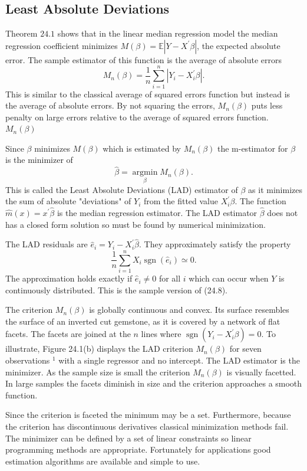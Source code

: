 \documentclass[10pt]{article}
\begin{document}
\subsection{Least Absolute Deviations}
Theorem $24.1$ shows that in the linear median regression model the median regression coefficient minimizes $M(\beta)=\mathbb{E}\left|Y-X^{\prime} \beta\right|$, the expected absolute error. The sample estimator of this function is the average of absolute errors
$$
M_{n}(\beta)=\frac{1}{n} \sum_{i=1}^{n}\left|Y_{i}-X_{i}^{\prime} \beta\right| .
$$
This is similar to the classical average of squared errors function but instead is the average of absolute errors. By not squaring the errors, $M_{n}(\beta)$ puts less penalty on large errors relative to the average of squared errors function. $M_{n}(\beta)$

Since $\beta$ minimizes $M(\beta)$ which is estimated by $M_{n}(\beta)$ the m-estimator for $\beta$ is the minimizer of
$$
\widehat{\beta}=\underset{\beta}{\operatorname{argmin}} M_{n}(\beta) .
$$
This is called the Least Absolute Deviations (LAD) estimator of $\beta$ as it minimizes the sum of absolute "deviations" of $Y_{i}$ from the fitted value $X_{i}^{\prime} \beta$. The function $\widehat{m}(x)=x^{\prime} \widehat{\beta}$ is the median regression estimator. The LAD estimator $\widehat{\beta}$ does not has a closed form solution so must be found by numerical minimization.

The LAD residuals are $\widehat{e}_{i}=Y_{i}-X_{i}^{\prime} \widehat{\beta}$. They approximately satisfy the property
$$
\frac{1}{n} \sum_{i=1}^{n} X_{i} \operatorname{sgn}\left(\widehat{e}_{i}\right) \simeq 0 .
$$
The approximation holds exactly if $\widehat{e}_{i} \neq 0$ for all $i$ which can occur when $Y$ is continuously distributed. This is the sample version of (24.8).

The criterion $M_{n}(\beta)$ is globally continuous and convex. Its surface resembles the surface of an inverted cut gemstone, as it is covered by a network of flat facets. The facets are joined at the $n$ lines where $\operatorname{sgn}\left(Y_{i}-X_{i}^{\prime} \beta\right)=0$. To illustrate, Figure 24.1(b) displays the LAD criterion $M_{n}(\beta)$ for seven observations ${ }^{1}$ with a single regressor and no intercept. The LAD estimator is the minimizer. As the sample size is small the criterion $M_{n}(\beta)$ is visually facetted. In large samples the facets diminish in size and the criterion approaches a smooth function.

Since the criterion is faceted the minimum may be a set. Furthermore, because the criterion has discontinuous derivatives classical minimization methods fail. The minimizer can be defined by a set of linear constraints so linear programming methods are appropriate. Fortunately for applications good estimation algorithms are available and simple to use.
\end{document}
